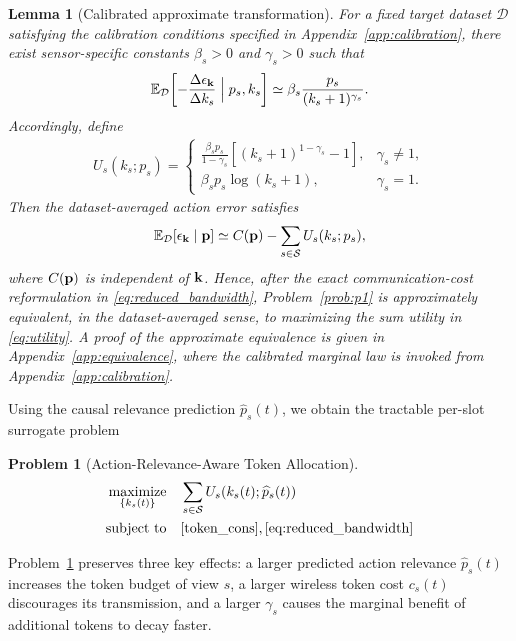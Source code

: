 \documentclass[lettersize,journal]{IEEEtran}
\theoremstyle{custom}
\newtheorem{Lem}{Lemma}
\newtheorem{Prob}{Problem}
\begin{document}
\begin{Lem}[Calibrated approximate transformation]\label{lem:marginal_law}
For a fixed target dataset $\mathcal D$ satisfying the calibration conditions specified in Appendix~\ref{app:calibration}, there exist sensor-specific constants $\beta_s>0$ and $\gamma_s>0$ such that
\begin{align}\label{eq:marginal_law}
    \mathbb E_{\mathcal D}\!\left[
    -\frac{\Delta\epsilon_{\bf k}}{\Delta k_s}
    \Bigm| p_s,k_s\right]
    \simeq
    \beta_s\frac{p_s}{(k_s+1)^{\gamma_s}}.
\end{align}
Accordingly, define
\begin{align}\label{eq:utility}
U_s(k_s;p_s)=
\begin{cases}
\displaystyle
\frac{\beta_s p_s}{1-\gamma_s}
\left[(k_s+1)^{1-\gamma_s}-1\right], & \gamma_s\neq1,\\[2mm]
\displaystyle
\beta_s p_s\log(k_s+1), & \gamma_s=1.
\end{cases}
\end{align}
Then the dataset-averaged action error satisfies
\begin{align}\label{eq:error_surrogate}
    \mathbb E_{\mathcal D}[\epsilon_{\bf k}\mid{\bf p}]
    \simeq C({\bf p})-\sum_{s\in\mathcal S}U_s(k_s;p_s),
\end{align}
where $C({\bf p})$ is independent of ${\bf k}$. Hence, after the exact communication-cost reformulation in \eqref{eq:reduced_bandwidth}, Problem~\ref{prob:p1} is approximately equivalent, in the dataset-averaged sense, to maximizing the sum utility in \eqref{eq:utility}. A proof of the approximate equivalence is given in Appendix~\ref{app:equivalence}, where the calibrated marginal law is invoked from Appendix~\ref{app:calibration}.
\end{Lem}

Using the causal relevance prediction $\widehat p_s(t)$, we obtain the tractable per-slot surrogate problem
\begin{Prob}[Action-Relevance-Aware Token Allocation]\label{prob:p2}
\begin{align}
    \underset{\{k_s(t)\}}{\textrm{maximize}}\quad
    & \sum_{s\in\mathcal S}U_s\!\left(k_s(t);\widehat p_s(t)\right) \label{eq:p2obj}\\
    \textrm{subject to}\quad
    & \eqref{token_cons}, \eqref{eq:reduced_bandwidth}\nonumber
\end{align}
\end{Prob}
Problem~\ref{prob:p2} preserves three key effects: a larger predicted action relevance $\widehat p_s(t)$ increases the token budget of view $s$, a larger wireless token cost $c_s(t)$ discourages its transmission, and a larger $\gamma_s$ causes the marginal benefit of additional tokens to decay faster.
\end{document}
